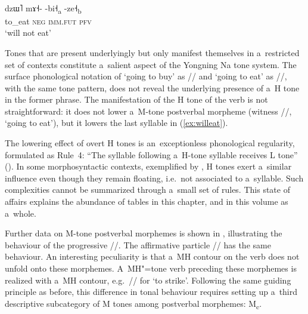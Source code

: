 \begin{exe}
	\ex
	\label{ex:willnoteat}
	\\
	\gll dzɯ˥		mɤ˧-	-bi˧\textsubscript{a}		-ze˧\textsubscript{b}\\
	to\_eat		\textsc{neg}	\textsc{imm.fut}		\textsc{pfv}\\
	\glt ‘will not eat’
\end{exe}

Tones that are present underlyingly but only manifest themselves in a~restricted set of contexts constitute a~salient aspect of the Yongning Na tone system. The surface phonological notation of ‘going to buy’
as // and ‘going to eat’ as //, with the same tone pattern, does not
reveal the underlying presence of a~H tone in the former phrase. The manifestation of the H tone of
the verb is not straightforward: it does not lower a~M-tone postverbal morpheme (witness //, ‘going
to eat’), but it lowers the last syllable in (\ref{ex:willeat}). 

The lowering effect of overt H tones is an~exceptionless phonological regularity, formulated as Rule~4: “The syllable following a~H-tone syllable receives L tone” (). In some morphosyntactic contexts, exemplified by , H tones exert a~similar influence even though they remain floating, i.e.\ not associated to a~syllable. Such complexities cannot be summarized through a~small set of rules. This state of affairs explains the abundance of tables in this chapter, and in this volume as a~whole. 

Further data on M-tone postverbal morphemes is shown in , illustrating the behaviour of the {progressive} //. The affirmative particle // has the same behaviour. An interesting peculiarity is that a~MH contour on the verb does not unfold onto these morphemes. A~MH"=tone verb preceding these morphemes is realized with a~MH contour, e.g.~//
for ‘to strike’. Following the same guiding principle as before, this difference in tonal behaviour requires setting up a~third descriptive subcategory of M tones among postverbal morphemes: M\textsubscript{c}.

